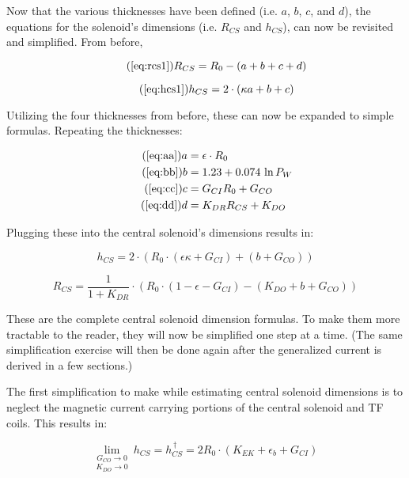 Now that the various thicknesses have been defined (i.e. $a$, $b$, $c$, and $d$), the equations for the solenoid's dimensions (i.e. $R_{CS}$ and $h_{CS}$), can now be revisited and simplified. From before,

 \begin{equation}
 	\tag{\ref{eq:rcs1}}
 	R_{CS} = R_0 - ( a + b + c + d )
 \end{equation}
 
 \begin{equation}
	\tag{\ref{eq:hcs1}}
 	h_{CS} = 2 \cdot \left ( \kappa a + b + c \right)
 \end{equation}

Utilizing the four thicknesses from before, these can now be expanded to simple formulas. Repeating the thicknesses:

\begin{align}
	\tag{\ref{eq:aa}}
	a &= \epsilon \cdot R_0 \\
	\tag{\ref{eq:bb}}
	b &= 1.23 + 0.074 \ \textnormal{ln} \, P_W \\
	\tag{\ref{eq:cc}}
	c &= G_{CI} R_0 + G_{CO} \\
 	\tag{\ref{eq:dd}}
	d &= K_{DR} R_{CS} + K_{DO} 
\end{align}

Plugging these into the central solenoid's dimensions results in:

\begin{equation}
	h_{CS} = 2 \cdot \left( R_0 \cdot \left( \epsilon \kappa + G_{CI} \right) + \left( b + G_{CO} \right) \right)
\end{equation}

\begin{equation}
	R_{CS} = \frac{ 1 }{ 1 + K_{DR} } \cdot \left( R_0 \cdot \left( 1 - \epsilon - G_{CI}  \right) - \left( K_{DO} + b + G_{CO}  \right) \right)
\end{equation}

These are the complete central solenoid dimension formulas. To make them more tractable to the reader, they will now be simplified one step at a time. (The same simplification exercise will then be done again after the generalized current is derived in a few sections.)

The first simplification to make while estimating central solenoid dimensions is to neglect the magnetic current carrying portions of the central solenoid and TF coils. This results in:

\begin{equation}
	\underset{K_{DO} \to 0}{\underset{G_{CO} \to 0}{\lim}} \ h_{CS} = h_{CS}^{\,\dagger} = 2 R_0 \cdot \left( K_{EK} + \epsilon_b + G_{CI} \right) 
\end{equation}

